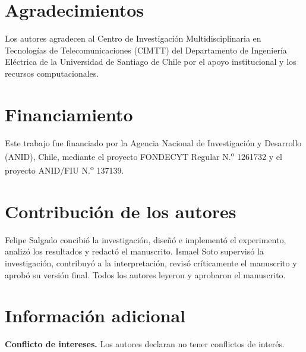 \documentclass[fleqn,10pt]{wlscirep}
\begin{document}
\section*{Agradecimientos}
Los autores agradecen al Centro de Investigación Multidisciplinaria en Tecnologías de Telecomunicaciones (CIMTT) del Departamento de Ingeniería Eléctrica de la Universidad de Santiago de Chile por el apoyo institucional y los recursos computacionales.

\section*{Financiamiento}
Este trabajo fue financiado por la Agencia Nacional de Investigación y Desarrollo (ANID), Chile, mediante el proyecto FONDECYT Regular N.\textsuperscript{o} 1261732 y el proyecto ANID/FIU N.\textsuperscript{o} 137139.

\section*{Contribución de los autores}
Felipe Salgado concibió la investigación, diseñó e implementó el experimento, analizó los resultados y redactó el manuscrito. Ismael Soto supervisó la investigación, contribuyó a la interpretación, revisó críticamente el manuscrito y aprobó su versión final. Todos los autores leyeron y aprobaron el manuscrito.

\section*{Información adicional}
\textbf{Conflicto de intereses.} Los autores declaran no tener conflictos de interés.
\end{document}
